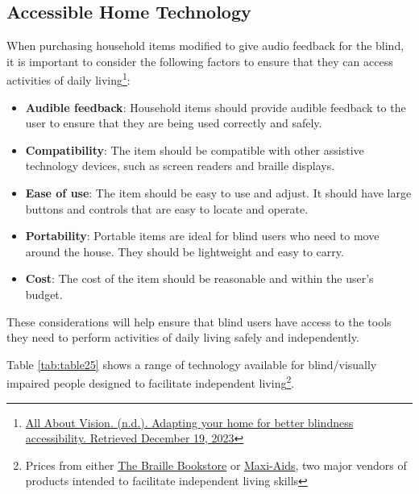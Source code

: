 \hypertarget{ind-living-tools}{}\subsection{Accessible Home Technology}\label{ind-living-tools}
When purchasing household items modified to give audio feedback for the blind, it is important to consider the following factors to ensure that they can access activities of daily living\footnote{\raggedright \href{http://www.allaboutvision.com/resources/adapting-the-home-better-blindness-accessibility/}{All About Vision. (n.d.). Adapting your home for better blindness accessibility. Retrieved December 19, 2023}}:
\begin{itemize}[leftmargin=*]
	\item \textbf{Audible feedback}: Household items should provide audible feedback to the user to ensure that they are being used correctly and safely.
	\item \textbf{Compatibility}: The item should be compatible with other assistive technology devices, such as screen readers and braille displays.
	\item \textbf{Ease of use}: The item should be easy to use and adjust. It should have large buttons and controls that are easy to locate and operate.
	\item \textbf{Portability}: Portable items are ideal for blind users who need to move around the house. They should be lightweight and easy to carry.
	\item \textbf{Cost}: The cost of the item should be reasonable and within the user’s budget.
\end{itemize}
These considerations will help ensure that blind users have access to the tools they need to perform activities of daily living safely and independently.

Table \ref{tab:table25} shows a range of technology available for blind/visually impaired people designed to facilitate independent living\footnote{\raggedright Prices from either \href{http://www.braillebookstore.com/}{The Braille Bookstore} or \href{http://www.maxiaids.com/}{Maxi-Aids}, two major vendors of products intended to facilitate independent living skills}.

\pagebreak 
 
